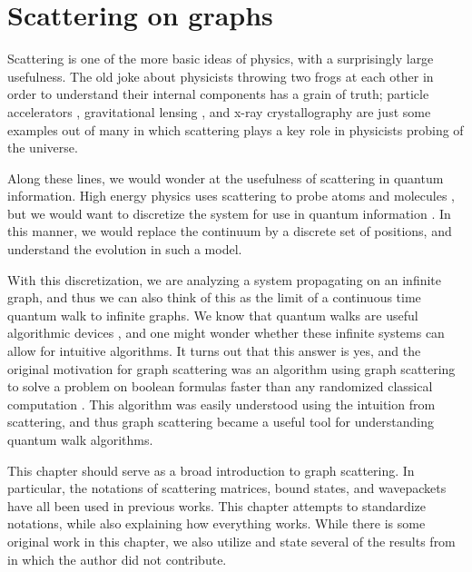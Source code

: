\documentclass[../thesis-main/thesis-main]{subfiles}
\begin{document}
\chapter{Scattering on graphs}
\label{chap:scattering_on_graphs}


Scattering is one of the more basic ideas of physics, with a surprisingly large usefulness.  The old joke about physicists throwing two frogs at each other  in order to understand their internal components has a grain of truth; particle accelerators , gravitational lensing , and x-ray crystallography  are just some examples out of many in which scattering plays a key role in physicists probing of the universe.

Along these lines, we would wonder at the usefulness of scattering in quantum information.  High energy physics uses scattering to probe atoms and molecules , but we would want to discretize the system for use in quantum information .  In this manner, we would replace the continuum by a discrete set of positions, and understand the evolution in such a model.

With this discretization, we are analyzing a system propagating on an infinite graph, and thus we can also think of this as the limit of a continuous time quantum walk to infinite graphs.  We know that quantum walks are useful algorithmic devices , and one might wonder whether these infinite systems can allow for intuitive algorithms.  It turns out that this answer is yes, and the original motivation for graph scattering was an algorithm using graph scattering to solve a problem on boolean formulas faster than any randomized classical computation \cite{FGG08}.  This algorithm was easily understood using the intuition from scattering, and thus graph scattering became a useful tool for understanding quantum walk algorithms.

This chapter should serve as a broad introduction to graph scattering.  In particular, the notations of scattering matrices, bound states, and wavepackets have all been used in previous works.  This chapter attempts to standardize notations, while also explaining how everything works.  While there is some original work in this chapter, we also utilize and state several of the results from \cite{FGG08,Chi09,CS11,CG12} in which the author did not contribute.
\end{document}
